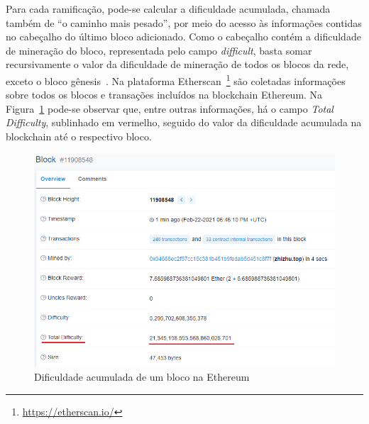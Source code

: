 Para cada ramificação, pode-se calcular a dificuldade acumulada, chamada também de ``o caminho mais pesado'', por meio do acesso às informações contidas no cabeçalho do último bloco adicionado. Como o cabeçalho contém a dificuldade de mineração do bloco, representada pelo campo \textit{difficult}, basta somar recursivamente o valor da dificuldade de mineração de todos os blocos da rede, exceto o bloco gênesis~\cite{wood2014ethereum-yellow-paper}. Na plataforma Etherscan~\footnote{\url{https://etherscan.io/}} são coletadas informações sobre todos os blocos e transações incluídos na blockchain Ethereum. Na Figura~\ref{fig:eth-block-difficulty} pode-se observar que, entre outras informações, há o campo \textit{Total Difficulty}, sublinhado em vermelho, seguido do valor da dificuldade acumulada na blockchain até o respectivo bloco.

\begin{figure}[htb]
 \caption{Dificuldade acumulada de um bloco na Ethereum}
 \label{fig:eth-block-difficulty}
 \centering
 \includegraphics[scale=0.6]{figuras/block-eth-difficulty.png}
\end{figure}





